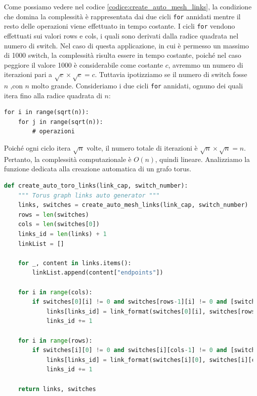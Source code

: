\documentclass[binding=0.6cm]{sapthesis}
\begin{document}
Come possiamo vedere nel codice \ref{codice:create_auto_mesh_links}, la condizione che domina la complessità è rappresentata dai due cicli \texttt{for} annidati mentre il resto delle
operazioni viene effettuato in tempo costante. I cicli \texttt{for} vendono effettuati sui valori rows e cols, i quali sono derivati dalla radice quadrata nel numero di switch. 
Nel caso di questa applicazione, in cui è permesso un massimo di 1000 switch, la complessità risulta essere in tempo costante, 
poiché nel caso peggiore il valore 1000 è considerabile come costante \(c\), 
avremmo un numero di iterazioni pari a  \( \sqrt{c} \times \sqrt{c} = c \).
Tuttavia ipotizziamo se il numero di switch fosse \(n\) 
,con \(n\) molto grande. Consideriamo i due cicli \texttt{for} annidati, ognuno dei quali itera fino alla radice quadrata di \( n \):
\begin{verbatim}
for i in range(sqrt(n)):
    for j in range(sqrt(n)):
        # operazioni
\end{verbatim}
Poiché ogni ciclo itera \( \sqrt{n} \) volte, il numero totale di iterazioni è \( \sqrt{n} \times \sqrt{n} = n \). Pertanto, la complessità computazionale è \( O(n) \), quindi lineare.
Analizziamo la funzione dedicata alla creazione automatica di un grafo torus.

{\scriptsize %
\begin{lstlisting}[language=Python, basicstyle=\ttfamily, caption={Funzione per la creazione automatica di un grafo torus}, label={codice:create_auto_torus_links}, breaklines=true]
    def create_auto_toro_links(link_cap, switch_number):
    """ Torus graph links auto generator """
    links, switches = create_auto_mesh_links(link_cap, switch_number)
    rows = len(switches)
    cols = len(switches[0])
    links_id = len(links) + 1
    linkList = []

    for _, content in links.items():
        linkList.append(content["endpoints"])
    
    for i in range(cols):
        if switches[0][i] != 0 and switches[rows-1][i] != 0 and [switches[0][i],switches[rows-1][i]] not in linkList:
            links[links_id] = link_format(switches[0][i], switches[rows-1][i], link_cap)
            links_id += 1

    for i in range(rows):
        if switches[i][0] != 0 and switches[i][cols-1] != 0 and [switches[i][0], switches[i][cols-1]] not in linkList:
            links[links_id] = link_format(switches[i][0], switches[i][cols-1], link_cap)
            links_id += 1

    return links, switches
\end{lstlisting}
} %
\end{document}
